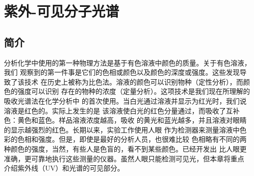 \chapter{紫外-可见分子光谱}
%
\section{简介}
分析化学中使用的第一种物理方法是基于有色溶液中颜色的质量。关于有色溶液，我们
观察到的第一件事是它们的色相或颜色以及颜色的深度或强度。这些发现导致了该技术
在历史上被称为比色法。溶液的颜色可以识别物种（定性分析），而颜色的强度可以识别
存在的物种的浓度（定量分析）。这项技术是我们现在所理解的吸收光谱法在化学分析中
的首次使用。当白光通过溶液并显示为红光时，我们说溶液是红色的。实际上发生的是
该溶液使白光的红色分量通过，而吸收了互补色：黄色和蓝色。样品溶液浓度越高，吸收
的黄光和蓝光越多，并且溶液对眼睛的显示越强烈的红色。长期以来，实验工作使用人眼
作为检测器来测量溶液中色彩的色相和强度。但是，即使是最好的分析人员，也很难比较
色相略有不同的两种颜色的强度，当然，有些人是色盲的，看不到某些颜色。已经开发出
比人眼更准确，更可靠地执行这些测量的仪器。虽然人眼只能检测可见光，但本章将重点
介绍紫外线（UV）和光谱的可见部分。

